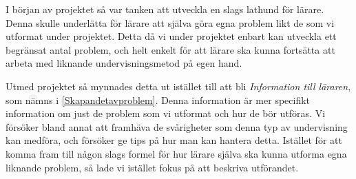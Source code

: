 \textcolor{Mahogany}{I början av projektet så var tanken att utveckla en slags lathund för lärare. Denna skulle underlätta för lärare att själva göra egna problem likt de som vi utformat under projektet. Detta då vi under projektet enbart kan utveckla ett begränsat antal problem, och helt enkelt för att lärare ska kunna fortsätta att arbeta med liknande undervisningsmetod på egen hand.}

\textcolor{Mahogany}{Utmed projektet så mynnades detta ut istället till att bli \textsl{Information till läraren}, som nämns i \ref{Skapandetavproblem}. Denna information är mer specifikt information om just de problem som vi utformat och hur de bör utföras. Vi försöker bland annat att framhäva de svårigheter som denna typ av undervisning kan medföra, och försöker ge tips på hur man kan hantera detta. Istället för att komma fram till någon slags formel för hur lärare själva ska kunna utforma egna liknande problem, så lade vi istället fokus på att beskriva utförandet.}